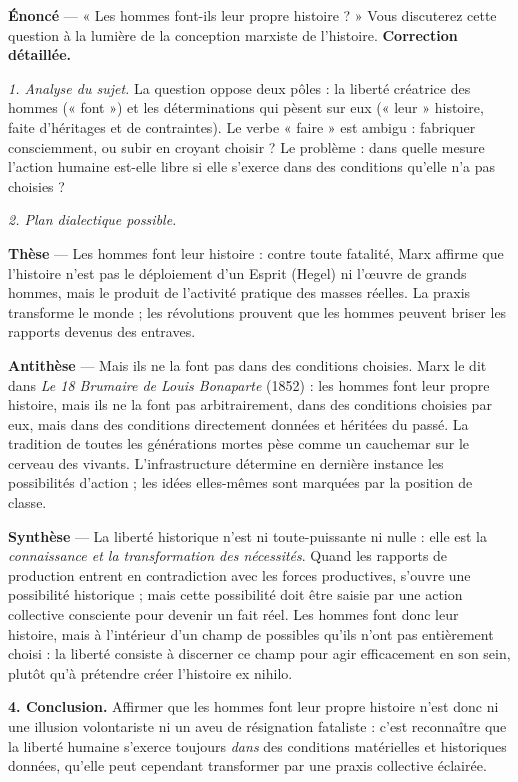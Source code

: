\documentclass[11pt]{article}
\begin{document}
\begin{exoresolu}
\textbf{Énoncé} — « Les hommes font-ils leur propre histoire ? » Vous discuterez cette question à la lumière de la conception marxiste de l'histoire.
\tcblower
\textbf{Correction détaillée.}

\emph{1. Analyse du sujet.} La question oppose deux pôles : la liberté créatrice des hommes (« font ») et les déterminations qui pèsent sur eux (« leur » histoire, faite d'héritages et de contraintes). Le verbe « faire » est ambigu : fabriquer consciemment, ou subir en croyant choisir ? Le problème : dans quelle mesure l'action humaine est-elle libre si elle s'exerce dans des conditions qu'elle n'a pas choisies ?

\emph{2. Plan dialectique possible.}

\textbf{Thèse} — Les hommes font leur histoire : contre toute fatalité, Marx affirme que l'histoire n'est pas le déploiement d'un Esprit (Hegel) ni l'œuvre de grands hommes, mais le produit de l'activité pratique des masses réelles. La praxis transforme le monde ; les révolutions prouvent que les hommes peuvent briser les rapports devenus des entraves.

\textbf{Antithèse} — Mais ils ne la font pas dans des conditions choisies. Marx le dit dans \emph{Le 18 Brumaire de Louis Bonaparte} (1852) : les hommes font leur propre histoire, mais ils ne la font pas arbitrairement, dans des conditions choisies par eux, mais dans des conditions directement données et héritées du passé. La tradition de toutes les générations mortes pèse comme un cauchemar sur le cerveau des vivants. L'infrastructure détermine en dernière instance les possibilités d'action ; les idées elles-mêmes sont marquées par la position de classe.

\textbf{Synthèse} — La liberté historique n'est ni toute-puissante ni nulle : elle est la \emph{connaissance et la transformation des nécessités}. Quand les rapports de production entrent en contradiction avec les forces productives, s'ouvre une possibilité historique ; mais cette possibilité doit être saisie par une action collective consciente pour devenir un fait réel. Les hommes font donc leur histoire, mais à l'intérieur d'un champ de possibles qu'ils n'ont pas entièrement choisi : la liberté consiste à discerner ce champ pour agir efficacement en son sein, plutôt qu'à prétendre créer l'histoire ex nihilo.

\textbf{4. Conclusion.} Affirmer que les hommes font leur propre histoire n'est donc ni une illusion volontariste ni un aveu de résignation fataliste : c'est reconnaître que la liberté humaine s'exerce toujours \emph{dans} des conditions matérielles et historiques données, qu'elle peut cependant transformer par une praxis collective éclairée.
\end{exoresolu}
\end{document}
